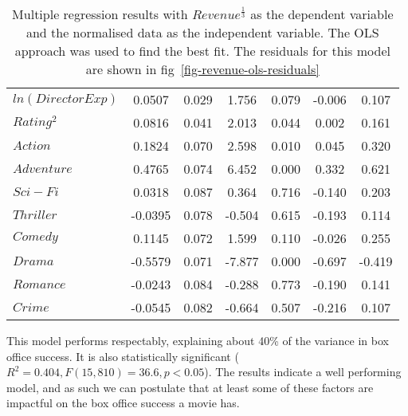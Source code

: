 \begin{table}[H]
\begin{center}
\begin{tabular}{lcccccc}
                    \textbf{$ln(Director Exp)$}     & 0.0507        & 0.029            & 1.756      & 0.079               & -0.006          & 0.107           \\
                    \textbf{$Rating^2$}             & 0.0816        & 0.041            & 2.013      & 0.044               & 0.002           & 0.161           \\
                    \textbf{$Action$}               & 0.1824        & 0.070            & 2.598      & 0.010               & 0.045           & 0.320           \\
                    \textbf{$Adventure$}            & 0.4765        & 0.074            & 6.452      & 0.000               & 0.332           & 0.621           \\
                    \textbf{$Sci-Fi$}               & 0.0318        & 0.087            & 0.364      & 0.716               & -0.140          & 0.203           \\
                    \textbf{$Thriller$}             & -0.0395       & 0.078            & -0.504     & 0.615               & -0.193          & 0.114           \\
                    \textbf{$Comedy$}               & 0.1145        & 0.072            & 1.599      & 0.110               & -0.026          & 0.255           \\
                    \textbf{$Drama$}                & -0.5579       & 0.071            & -7.877     & 0.000               & -0.697          & -0.419          \\
                    \textbf{$Romance$}              & -0.0243       & 0.084            & -0.288     & 0.773               & -0.190          & 0.141           \\
                    \textbf{$Crime$}                & -0.0545       & 0.082            & -0.664     & 0.507               & -0.216          & 0.107           \\
                    \bottomrule
                \end{tabular}
            \end{center}
            \caption[short]{Multiple regression results with $Revenue^{\frac{1}{3}}$ as the dependent variable
            and the normalised data as the independent variable.
            The OLS approach was used to find the best fit.
            The residuals for this model are shown in
                fig~\ref{fig-revenue-ols-residuals}}\label{tab-revenue-ols-summary} \end{table}
                This model performs respectably, explaining about 40\% of the variance in box
                office success.
            It is also statistically significant ($R^2=0.404, F(15,810)=36.6, p<0.05$).
            The results indicate a well performing model, and as such we can postulate that
                at least some of these factors are impactful on the box office success a movie
                has.

